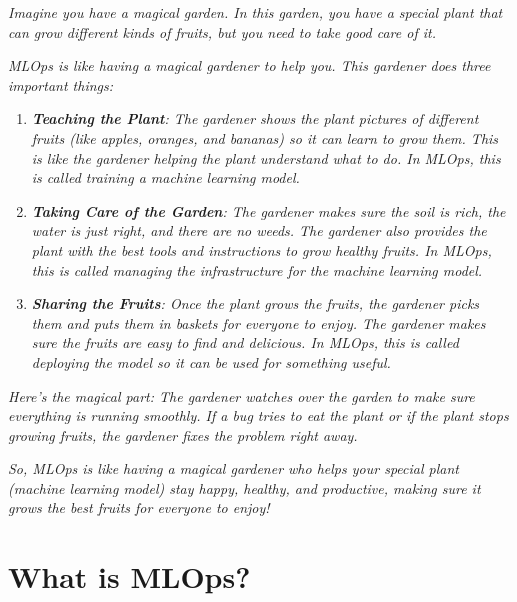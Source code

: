 \documentclass[letterpaper,12pt,notitlepage,twoside]{report}
\begin{document}
\begin{mathaside}[frametitle=\mathtitle{Explaining MLOps to a \color{firebrick}{5 year old}}]
\textit{Imagine you have a magical garden. In this garden, you have a special plant that can grow different kinds of fruits, but you need to take good care of it.}

\textit{MLOps is like having a magical gardener to help you. This gardener does three important things:}
\begin{enumerate}
    \item \textit{\textbf{Teaching the Plant}: The gardener shows the plant pictures of different fruits (like apples, oranges, and bananas) so it can learn to grow them. This is like the gardener helping the plant understand what to do. In MLOps, this is called training a machine learning model.}
    
    \item \textit{\textbf{Taking Care of the Garden}: The gardener makes sure the soil is rich, the water is just right, and there are no weeds. The gardener also provides the plant with the best tools and instructions to grow healthy fruits. In MLOps, this is called managing the infrastructure for the machine learning model.}
    
    \item \textit{\textbf{Sharing the Fruits}: Once the plant grows the fruits, the gardener picks them and puts them in baskets for everyone to enjoy. The gardener makes sure the fruits are easy to find and delicious. In MLOps, this is called deploying the model so it can be used for something useful.}
\end{enumerate}

\textit{Here's the magical part: The gardener watches over the garden to make sure everything is running smoothly. If a bug tries to eat the plant or if the plant stops growing fruits, the gardener fixes the problem right away.}

\textit{So, MLOps is like having a magical gardener who helps your special plant (machine learning model) stay happy, healthy, and productive, making sure it grows the best fruits for everyone to enjoy!}
\end{mathaside}


\section{What is MLOps?}
\end{document}
